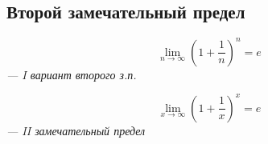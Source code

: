 \documentclass[12pt, a4paper]{article}
\theoremstyle{remark}
\begin{document}
	\subsection{Второй замечательный предел}
	
	\begin{tcolorbox}[colframe=red!70!black, colback=white, boxrule=1pt, arc=3pt, width=\textwidth]
		\centering
		\large
		\[
		\lim_{n \to \infty} \left(1 + \frac{1}{n}\right)^n = e
		\]
		\normalsize \textit{--- I вариант второго з.п.}
	\end{tcolorbox}
	
	\begin{tcolorbox}[colframe=red!70!black, colback=white, boxrule=1pt, arc=3pt, width=\textwidth]
		\centering
		\large
		\[
		\lim_{x \to \infty} \left(1 + \frac{1}{x}\right)^x = e
		\]
		\normalsize \textit{--- II замечательный предел}
	\end{tcolorbox}
	
\end{document}
